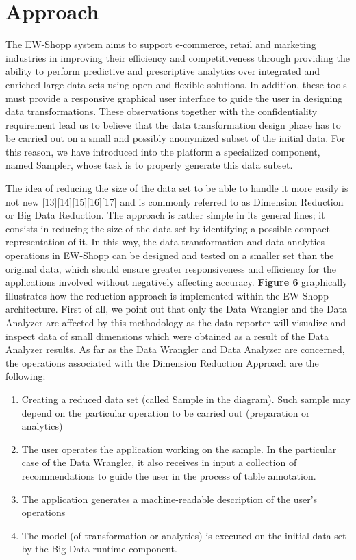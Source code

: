 \section{Approach}
The EW-Shopp system aims to support e-commerce, retail and marketing industries in improving their efficiency and competitiveness through providing the ability to perform predictive and prescriptive analytics over integrated and enriched large data sets using open and flexible solutions. In addition, these tools must provide a responsive graphical user interface to guide the user in designing data transformations. These observations together with the confidentiality requirement lead us to believe that the data transformation design phase has to be carried out on a small and possibly anonymized subset of the initial data. For this reason, we have introduced into the platform a specialized component, named Sampler, whose task is to properly generate this data subset. 

The idea of reducing the size of the data set to be able to handle it more easily is not new \cite{XXX}[13][14][15][16][17]
and is commonly referred to as Dimension Reduction or Big Data Reduction. The approach is rather simple in its general lines; it consists in reducing the size of the data set by identifying a possible compact representation of it. In this way, the data transformation and data analytics operations in EW-Shopp can be designed and tested on a smaller set than the original data, which should ensure greater responsiveness and efficiency for the applications involved without negatively affecting accuracy.
\textbf{Figure 6} graphically illustrates how the reduction approach is implemented within the EW-Shopp architecture. First of all, we point out that only the Data Wrangler and the Data Analyzer are affected by this methodology as the data reporter will visualize and inspect data of small dimensions which were obtained as a result of the Data Analyzer results. 
As far as the Data Wrangler and Data Analyzer are concerned, the operations associated with the Dimension Reduction Approach are the following:

\begin{enumerate}
    \item Creating a reduced data set (called Sample in the diagram). Such sample may depend on the particular operation to be carried out (preparation or analytics)
    \item 	The user operates the application working on the sample. In the particular case of the Data Wrangler, it also receives in input a collection of recommendations to guide the user in the process of table annotation.
    \item The application generates a machine-readable description of the user's operations
    \item The model (of transformation or analytics) is executed on the initial data set by the Big Data runtime component.
\end{enumerate}

